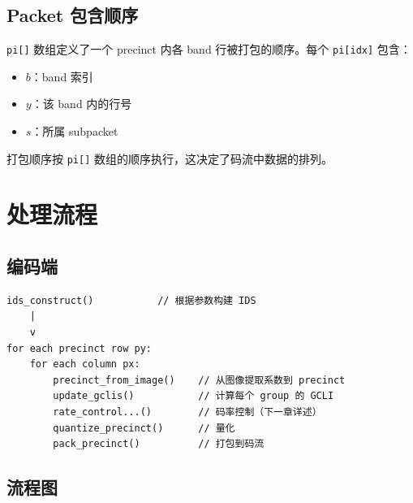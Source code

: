 \subsection{Packet 包含顺序}

\texttt{pi[]} 数组定义了一个 precinct 内各 band 行被打包的顺序。每个 \texttt{pi[idx]} 包含：
\begin{itemize}
  \item $b$：band 索引
  \item $y$：该 band 内的行号
  \item $s$：所属 subpacket
\end{itemize}

打包顺序按 \texttt{pi[]} 数组的顺序执行，这决定了码流中数据的排列。

\section{处理流程}

\subsection{编码端}

\begin{lstlisting}[numbers=none]
ids_construct()           // 根据参数构建 IDS
    |
    v
for each precinct row py:
    for each column px:
        precinct_from_image()    // 从图像提取系数到 precinct
        update_gclis()           // 计算每个 group 的 GCLI
        rate_control...()        // 码率控制（下一章详述）
        quantize_precinct()      // 量化
        pack_precinct()          // 打包到码流
\end{lstlisting}

\subsection{流程图}

